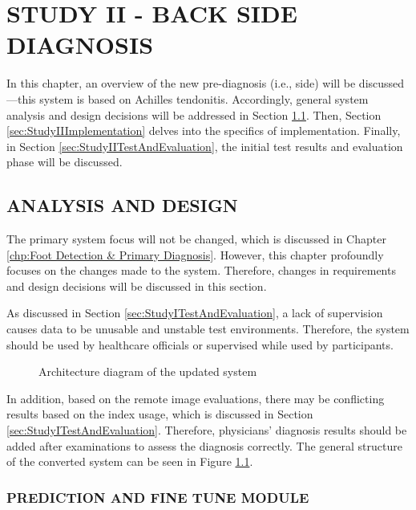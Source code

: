 \chapter{STUDY II - BACK SIDE DIAGNOSIS}\label{chp:Back Side Diagnosis}

In this chapter, an overview of the new pre-diagnosis (i.e., side) will be discussed—this system is based on Achilles tendonitis. Accordingly, general system analysis and design decisions will be addressed in Section \ref{sec:StudyIIAnalysisAndDesign}. Then, Section \ref{sec:StudyIIImplementation} delves into the specifics of implementation. Finally, in Section \ref{sec:StudyIITestAndEvaluation}, the initial test results and evaluation phase will be discussed.

\section{ANALYSIS AND DESIGN} \label{sec:StudyIIAnalysisAndDesign}

The primary system focus will not be changed, which is discussed in Chapter \ref{chp:Foot Detection & Primary Diagnosis}. However, this chapter profoundly focuses on the changes made to the system. Therefore, changes in requirements and design decisions will be discussed in this section.

As discussed in Section \ref{sec:StudyITestAndEvaluation}, a lack of supervision causes data to be unusable and unstable test environments. Therefore, the system should be used by healthcare officials or supervised while used by participants.

\begin{figure}[htbp]
\centering
{}
\caption{Architecture diagram of the updated system}
\label{fig:GeneralArchitectureDiagramPartI}
\end{figure}

In addition, based on the remote image evaluations, there may be conflicting results based on the index usage, which is discussed in Section \ref{sec:StudyITestAndEvaluation}. Therefore, physicians' diagnosis results should be added after examinations to assess the diagnosis correctly. The general structure of the converted system can be seen in Figure \ref{fig:GeneralArchitectureDiagramPartI}. 

\subsection{ PREDICTION AND FINE TUNE MODULE }


